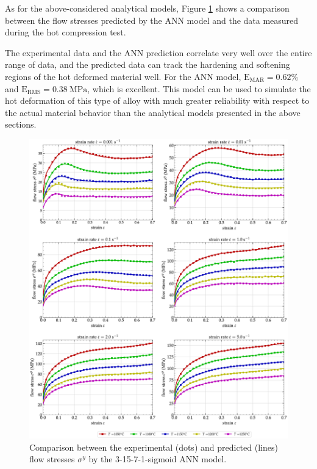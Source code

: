 \documentclass[metals,article,accept,pdftex,moreauthors]{Definitions/mdpi}
\DeclareRobustCommand{\RMSE}{\text{E}_\text{RMS}}
\DeclareRobustCommand{\MARE}{\text{E}_\text{MAR}}
\DeclareRobustCommand{\MPa}{\text{MPa}}
\begin{document}
As for the above-considered analytical models, Figure \ref{fig:CompExp-3-15-7-1-sigmoid} shows a comparison between the flow stresses predicted by the ANN model and the data measured during the hot compression test.

The experimental data and the ANN prediction correlate very well over the entire range of data, and the predicted data can track the hardening and softening regions of the hot deformed material well.
For the ANN model, $\MARE=0.62\%$ and $\RMSE=0.38~\MPa$, which is excellent.
This model can be used to simulate the hot deformation of this type of alloy with much greater reliability with respect to the actual material behavior than the analytical models presented in the above sections.


\begin{figure}[H]

\includegraphics[width=0.98\columnwidth]
{Figures/CompExp-3-15-7-1-sigmoid}
\caption{Comparison between the experimental (dots) and predicted (lines) flow stresses $\sigma^y$ by the 3-15-7-1-sigmoid ANN model.}
\label{fig:CompExp-3-15-7-1-sigmoid}
\end{figure}

\end{document}
